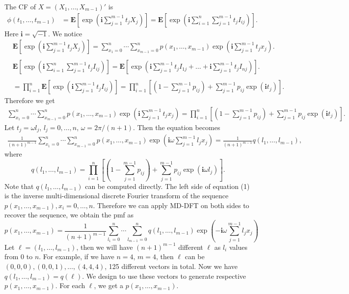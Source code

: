 \documentclass[12pt]{article}
\newcommand{\EE}{\mathbf{E}}
\newcommand{\ivec}{{\boldsymbol{i}}}
\begin{document}
The CF of $X=(X_1, \dots, X_{m-1})'$ is
\begin{align*}
\phi(t_1, \dots, t_{m-1}) & = \EE\left[\exp\left(\ivec\sum_{j=1}^{m-1}t_jX_j\right)\right]=\EE\left[\exp\left(\ivec\sum_{i = 1}^n \sum_{j=1}^{m-1}t_j I_{ij}\right)\right].
\end{align*}
Here $\ivec=\sqrt{-1}$. We notice\\
\begin{equation*}
\begin{split}
  &\EE\left[\exp\left(\ivec\sum_{j=1}^{m-1}t_jX_j\right)\right] = \sum_{x_1 = 0}^{n}\cdots \sum_{x_{m-1} = 0}^n p(x_1,\ldots,x_{m-1})\exp\left(\ivec\sum_{j=1}^{m-1}t_jx_j\right).\\
  \\
  &\EE\left[\exp\left(\ivec\sum_{i = 1}^n \sum_{j=1}^{m-1}t_j I_{ij}\right)\right] = \EE\left[ \exp\left( \ivec\sum_{j=1}^{m-1} t_jI_{1j} + \dots + \ivec\sum_{j=1}^{m-1} t_jI_{nj}\right)\right].\\
  \\
  & = \prod_{i=1}^n \EE\left[ \exp\left( \ivec \sum_{j=1}^{m-1} t_j I_{ij}\right)\right] = \prod_{i=1}^n \left[(1 - \sum_{j=1}^{m-1}p_{ij})+\sum_{j=1}^{m-1}p_{ij}\exp(\ivec t_j)\right].
\end{split}
\end{equation*}
Therefore we get
\begin{align*}
\sum_{x_1 = 0}^{n}\cdots \sum_{x_{m-1} = 0}^n p(x_1,\ldots,x_{m-1})\exp\left(\ivec\sum_{j=1}^{m-1}t_jx_j\right)= \prod_{i=1}^{n}\left[(1 - \sum_{j=1}^{m-1}p_{ij})+\sum_{j=1}^{m-1}p_{ij}\exp(\ivec t_j)\right].
\end{align*}
Let $t_j = \omega l_j$, $l_j = 0, \ldots, n$, $\omega = 2\pi/(n+1)$. Then the equation becomes
\begin{align}
\frac{1}{(n+1)^{m-1}} \sum_{x_1 = 0}^{n}\cdots \sum_{x_{m-1} = 0}^n p(x_1,\ldots,x_{m-1}) \exp\left(\ivec\omega\sum_{j=1}^{m-1}l_j x_j\right)= \frac{1}{(n+1)^{m-1}} q(l_1, \ldots, l_{m-1}),
\end{align}
where
$$ q(l_1, \ldots, l_{m-1})=\prod_{i=1}^{n}\left[(1 - \sum_{j=1}^{m-1}p_{ij})+\sum_{j=1}^{m-1}p_{ij}\exp(\ivec \omega l_j)\right].$$	
Note that $q(l_1, \ldots, l_{m-1})$ can be computed directly. The left side of equation (1) is the inverse multi-dimensional discrete Fourier transform of the sequence $ p(x_1,\ldots,x_{m-1}), x_i = 0 , \dots, n$. Therefore we can apply MD-DFT on both sides to recover the sequence, we obtain the pmf as
\begin{equation}
p(x_1, \ldots, x_{m-1}) = \frac{1}{(n+1)^{m-1}}\sum_{l_1 = 0}^{n}\cdots \sum_{l_{m-1} = 0}^n q(l_1, \ldots, l_{m-1}) \exp\left(-\ivec\omega\sum_{j=1}^{m-1}l_j x_j\right)
\end{equation}
Let $\ell = (l_1,\dots,l_{m-1})$, then we will have $(n
+1)^{m-1}$ different $\ell$ as $l_i$ values from $0$ to $n$. For example, if we have $n=4$, $m=4$, then $\ell$ can be $(0, 0, 0), (0, 0, 1), \dots, (4, 4, 4)$, 125 different vectors in total. Now we have $q(l_1,\dots,l_{m-1}) = q(\ell)$. We design to use these vectors to generate respective $p(x_1,\dots,x_{m-1})$. For each $\ell$, we get a $p(x_1,\dots,x_{m-1})$.
\end{document}
